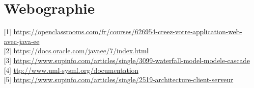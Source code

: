 \chapter*{Webographie}
[1] \href{https://openclassrooms.com/fr/courses/626954-creez-votre-application-web-avec-java-ee}{https://openclassrooms.com/fr/courses/626954-creez-votre-application-web-avec-java-ee}\\

[2] \href{https://docs.oracle.com/javaee/7/index.html}{https://docs.oracle.com/javaee/7/index.html}\\

[3] \href{https://www.supinfo.com/articles/single/3099-waterfall-model-modele-cascade}{https://www.supinfo.com/articles/single/3099-waterfall-model-modele-cascade}\\

[4] \href{http://www.uml-sysml.org/documentation}{ttp://www.uml-sysml.org/documentation} \\

[5] \href{https://www.supinfo.com/articles/single/2519-architecture-client-serveur}{https://www.supinfo.com/articles/single/2519-architecture-client-serveur}    
 \\  



